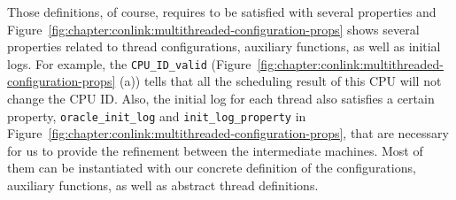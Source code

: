 Those definitions, of course, requires to be satisfied with several properties and Figure~\ref{fig:chapter:conlink:multithreaded-configuration-props} shows several properties related to thread configurations, auxiliary functions, as well as initial logs.
For example, 
the \lstinline$CPU_ID_valid$ (Figure~\ref{fig:chapter:conlink:multithreaded-configuration-props} (a))
tells that all the scheduling result of this CPU 
will not change the CPU ID. 
Also, the initial log for each thread also satisfies a certain property, \lstinline$oracle_init_log$ and \lstinline$init_log_property$
in Figure~\ref{fig:chapter:conlink:multithreaded-configuration-props},
that are necessary for us to provide the 
refinement between the intermediate machines. 
Most of them can be instantiated with our concrete definition of the configurations, auxiliary functions,
as well as abstract thread definitions. 
%

%
%
%
%
%
%
%
%       
%
